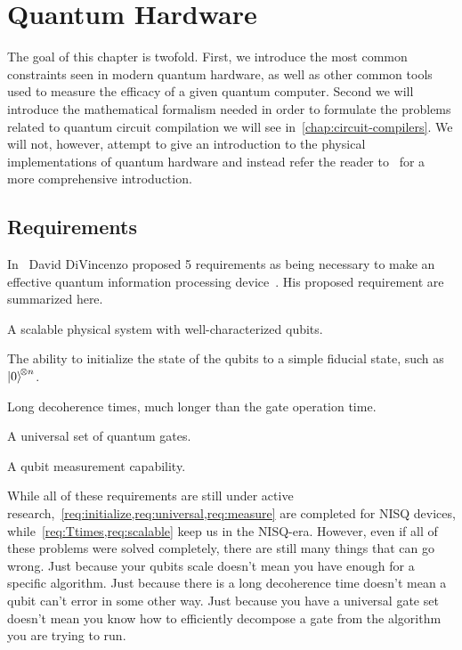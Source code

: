 \chapter{Quantum Hardware}\label{chap:hardware}

The goal of this chapter is twofold.
First, we introduce the most common constraints seen in modern quantum hardware, as well as other common tools used to measure the efficacy of a given quantum computer.
Second we will introduce the mathematical formalism needed in order to formulate the problems related to quantum circuit compilation we will see in~\cref{chap:circuit-compilers}.
We will not, however, attempt to give an introduction to the physical implementations of quantum hardware and instead refer the reader to~\cite[Chapter 7]{nielsenchuang} for a more comprehensive introduction.

\section{Requirements}

In~\citeyear{divincenzo} David DiVincenzo proposed 5 requirements as being necessary to make an effective quantum information processing device~\cite{divincenzo}.
His proposed requirement are summarized here.
\begin{requirements}
    \item A scalable physical system with well-characterized qubits.\label{req:scalable}
    \item The ability to initialize the state of the qubits to a simple fiducial state, such as $\ket{0}^{\!\otimes n}$.\label{req:initialize}
    \item Long decoherence times, much longer than the gate operation time.\label{req:Ttimes}
    \item A universal set of quantum gates.\label{req:universal}
    \item A qubit measurement capability.\label{req:measure}
\end{requirements}
While all of these requirements are still under active research,~\cref{req:initialize,req:universal,req:measure} are completed for \ac{NISQ} devices, while~\cref{req:Ttimes,req:scalable} keep us in the \ac{NISQ}-era.
However, even if all of these problems were solved completely, there are still many things that can go wrong.
Just because your qubits scale doesn't mean you have enough for a specific algorithm.
Just because there is a long decoherence time doesn't mean a qubit can't error in some other way.
Just because you have a universal gate set doesn't mean you know how to efficiently decompose a gate from the algorithm you are trying to run.

